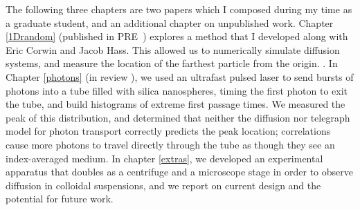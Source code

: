 The following three chapters are two papers which I composed during my time as a graduate student, and an additional chapter on unpublished work. Chapter \ref{1Drandom} (published in PRE~\cite{hass_anomalous_2023}) explores a method that I developed along with Eric Corwin and Jacob Hass. This allowed us to numerically simulate diffusion systems, and measure the location of the farthest particle from the origin. . In Chapter \ref{photons} (in review ), we used an ultrafast pulsed laser to send bursts of photons into a tube filled with silica nanospheres, timing the first photon to exit the tube, and build histograms of extreme first passage times. We measured the peak of this distribution, and determined that neither the diffusion nor telegraph model for photon transport correctly predicts the peak location; correlations cause more photons to travel directly through the tube as though they see an index-averaged medium. In chapter \ref{extras}, we developed an experimental apparatus that doubles as a centrifuge and a microscope stage in order to observe diffusion in colloidal suspensions, and we report on current design and the potential for future work.